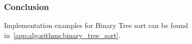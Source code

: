 \documentclass{subfile}
\begin{document}
\begin{multicols}{2}
     \subsubsection{Conclusion}\label{ssub:conclusion}
     

     Implementation examples for Binary Tree sort can be found
     in~\ref{app:algorithms:binary_tree_sort}.
   \end{multicols}
\end{document}
